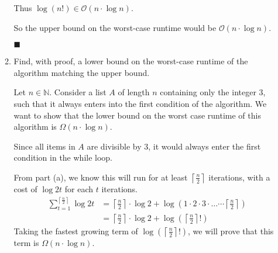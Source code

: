 \documentclass{article}
\newcommand\qedsymbol{\hfill$\blacksquare$}
\begin{document}
\begin{enumerate}
\begin{enumerate}[label=(\alph*)]
                Thus 
                $\log (n!) \in \mathcal{O} (n \cdot \log n )$.

                So the upper bound on the worst-case runtime would be 
                $\mathcal{O} (n \cdot \log n)$.
                
                \qedsymbol
                \newpage
            \item Find, with proof, a lower bound on the worst-case 
                runtime of the algorithm matching the upper bound. 

                Let $n \in \mathbb{N}$. Consider a list $A$ of length $n$ 
                containing only the integer $3$, such that it always enters 
                into the first condition of the algorithm. We want to show 
                that the lower bound on the worst case runtime of 
                this algorithm is $\Omega(n \cdot \log n)$.

                Since all items in $A$ are divisible by $3$, it would 
                always enter the first condition in the while loop. 

                From part (a), we know this will run for at least 
                $\left\lceil \frac{n}{2} \right\rceil $ iterations, 
                with a cost of $\log 2t$ for each $t$ iterations. 
                \begin{align*}
                    \sum_{t=1}^{\left\lceil \frac{n}{2} \right\rceil } 
                    \log 2t &= \left\lceil \frac{n}{2} \right\rceil  \cdot 
                    \log 2 +
                    \log (1 \cdot 2 \cdot 3 \cdot \ldots \cdots \left\lceil 
                    \frac{n}{2}\right\rceil ) \\
                            &= \left\lceil \frac{n}{2} \right\rceil \cdot 
                            \log 2 + \log (\left\lceil \frac{n}{2} \right\rceil !)
                \end{align*}
                Taking the fastest growing term of $\log (\left\lceil 
                \frac{n}{2}\right\rceil! )$, we will prove that this 
                term is $\Omega (n \cdot \log n)$. 


\end{enumerate}
\end{enumerate}
\end{document}

